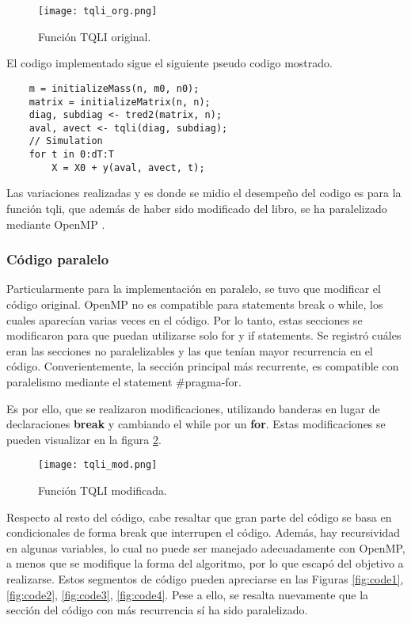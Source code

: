 \begin{figure}
	\centering
	\texttt{[image: tqli\_org.png]}
	\caption{Función TQLI original.}
	\label{fig:tqli_original}
\end{figure}


El codigo implementado sigue el siguiente pseudo codigo mostrado. 
\begin{verbatim}
	m = initializeMass(n, m0, n0);
	matrix = initializeMatrix(n, n);
	diag, subdiag <- tred2(matrix, n);
	aval, avect <- tqli(diag, subdiag);
	// Simulation
	for t in 0:dT:T
		X = X0 + y(aval, avect, t);
\end{verbatim}

Las variaciones realizadas y es donde se midio el desempeño del codigo es para la función tqli, que además de haber sido modificado del libro, se ha paralelizado mediante OpenMP \cite{al2017parallel}.


\subsubsection{Código paralelo}
Particularmente para la implementación en paralelo, se tuvo que modificar el código original. OpenMP no es compatible para statements break o while, los cuales aparecían varias veces en el código. Por lo tanto, estas secciones se modificaron para que puedan utilizarse solo for y if statements. Se registró cuáles eran las secciones no paralelizables y las que tenían mayor recurrencia en el código. Converientemente, la sección principal más recurrente, es compatible con paralelismo mediante el statement \#pragma-for. 


Es por ello, que se realizaron modificaciones, utilizando banderas en lugar de declaraciones \textbf{break} y cambiando el while por un \textbf{for}. Estas modificaciones se pueden visualizar en la figura \ref{fig:tqli_modificada}.

\begin{figure}
	\centering
	\texttt{[image: tqli\_mod.png]}
	\caption{Función TQLI modificada.}
	\label{fig:tqli_modificada}
\end{figure}

Respecto al resto del código, cabe resaltar que gran parte del código se basa en condicionales de forma break que interrupen el código. Además, hay recursividad en algunas variables, lo cual no puede ser manejado adecuadamente con OpenMP, a menos que se modifique la forma del algoritmo, por lo que escapó del objetivo a realizarse. Estos segmentos de código pueden apreciarse en las Figuras \ref{fig:code1}, \ref{fig:code2}, \ref{fig:code3}, \ref{fig:code4}. Pese a ello, se resalta nuevamente que la sección del código con más recurrencia sí ha sido paralelizado.


